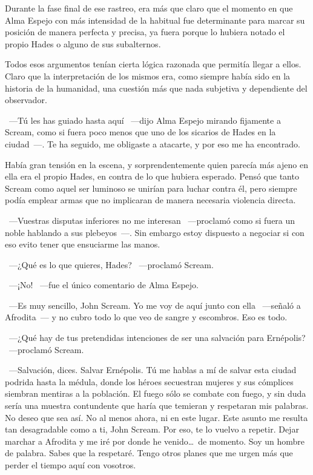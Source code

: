Durante la fase final de ese rastreo, era más que claro que el momento en que Alma Espejo  con más intensidad de la habitual fue determinante para marcar su posición de manera perfecta y precisa, ya fuera porque lo hubiera notado el propio Hades o alguno de sus subalternos.

Todos esos argumentos tenían cierta lógica razonada que permitía llegar a ellos. Claro que la interpretación de los mismos era, como siempre había sido en la historia de la humanidad, una cuestión más que nada subjetiva y dependiente del observador.

~---Tú les has guiado hasta aquí ~---dijo Alma Espejo mirando fijamente a Scream, como si fuera poco menos que uno de los sicarios de Hades en la ciudad~---. Te ha seguido, me obligaste a atacarte, y por eso me ha encontrado.

Había gran tensión en la escena, y sorprendentemente quien parecía más ajeno en ella era el propio Hades, en contra de lo que hubiera esperado. Pensó que tanto Scream como aquel ser luminoso se unirían para luchar contra él, pero siempre podía emplear armas que no implicaran de manera necesaria violencia directa.

~---Vuestras disputas inferiores no me interesan ~---proclamó como si fuera un noble hablando a sus plebeyos~---. Sin embargo estoy dispuesto a negociar si con eso evito tener que ensuciarme las manos.

~---¿Qué es lo que quieres, Hades? ~---proclamó Scream.

~---¡No! ~---fue el único comentario de Alma Espejo.

~---Es muy sencillo, John Scream. Yo me voy de aquí junto con ella ~---señaló a Afrodita~--- y no cubro todo lo que veo de sangre y escombros. Eso es todo.

~---¿Qué hay de tus pretendidas intenciones de ser una salvación para Ernépolis? ~---proclamó Scream.

~---Salvación, dices. Salvar Ernépolis. Tú me hablas a mí de salvar esta ciudad podrida hasta la médula, donde los héroes secuestran mujeres y sus cómplices siembran mentiras a la población. El fuego sólo se combate con fuego, y sin duda sería una muestra contundente que haría que temieran y respetaran mis palabras. No deseo que sea así. No al menos ahora, ni en este lugar. Este asunto me resulta tan desagradable como a ti, John Scream. Por eso, te lo vuelvo a repetir. Dejar marchar a Afrodita y me iré por donde he venido\dots\ de momento. Soy un hombre de palabra. Sabes que la respetaré. Tengo otros planes que me urgen más que perder el tiempo aquí con vosotros.

